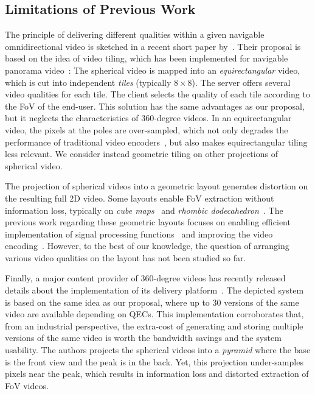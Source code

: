 

\subsection{Limitations of Previous Work}

The principle of delivering different qualities within a given navigable omnidirectional video is sketched 
in a recent short paper by~\citet{ochi_live_2015}. Their proposal is based on the idea of video
tiling, which has been implemented for navigable panorama 
video~\cite{sanchez_compressed_2015,wang_mixing_2014,gaddam_tiling_2015}: 
The spherical video is mapped into an \emph{equirectangular} video, which
is cut into independent \emph{tiles} (typically $8\times 8$). The server offers several
video qualities for each tile. The client selects the quality of each tile according to 
the \ac{FoV} of the end-user. This
solution has the same advantages as our proposal, but it neglects
the characteristics of 360-degree
videos. In an equirectangular video, the pixels 
at the poles are over-sampled, which not only degrades the
performance of traditional video encoders~\cite{wojciechowski_h.264_2006,yu_framework_2015}, but also 
makes equirectangular tiling less relevant. We consider instead geometric tiling on
other projections of spherical video.


The projection of spherical videos into a geometric layout generates 
distortion on the resulting
full 2D video. Some layouts enable \ac{FoV} extraction without information 
loss, typically on \emph{cube maps}~\cite{Ng2005} and 
\emph{rhombic dodecahedron}~\cite{fu_rhombic_2009}. The previous work regarding 
these
geometric layouts focuses on enabling efficient implementation of signal processing 
functions~\cite{kazhdan_metric-aware_2010} and improving the video 
encoding~\cite{tosic_low_2009}. 
However, to the best of our knowledge, the 
question of arranging various video qualities on the layout has not been studied so far.

Finally, a major content provider of 360-degree videos has recently released details about the 
implementation of its delivery platform~\cite{facebook}. The depicted system is based 
on the same idea as our proposal, where up to 30 versions of the same video are available depending on
\acp{QEC}. This implementation corroborates that, from an industrial perspective, the 
extra-cost of
generating and storing multiple versions of the same video is worth the bandwidth
savings and the system usability. The authors projects the spherical videos into a \emph{pyramid} 
where the 
base is the front
view and the peak is in the back. Yet, this projection under-samples pixels near the peak, 
which 
results in 
information loss and distorted extraction of \ac{FoV} videos.


